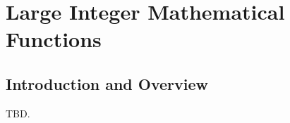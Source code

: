 \chapter[Large Integer Mathematical Functions]
        {Large Integer Mathematical Functions}


\label{claf1}

\section{Introduction and Overview}
\label{claf1:siov0}

TBD.


